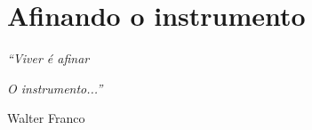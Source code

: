 \chapter{Afinando o instrumento}

\singlespacing
\begin{flushright}

\textit{``Viver é afinar}

\textit{O instrumento...''}

Walter Franco
\end{flushright}
\doublespacing


